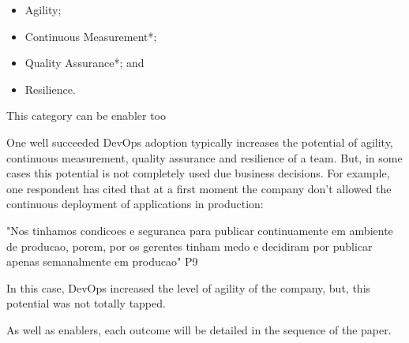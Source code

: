 \begin{itemize}
\item Agility;
\item Continuous Measurement*;
\item Quality Assurance*; and
\item Resilience.
\end{itemize}

\footnotesize * This category can be enabler too


\normalsize
One well succeeded DevOps adoption typically increases the potential of agility, continuous measurement, quality assurance and resilience of a team. But, in some cases this potential is not completely used due business decisions. For example, one respondent has cited that at a first moment the company don't allowed the continuous deployment of applications in production:

"Nos tinhamos condicoes e seguranca para publicar continuamente em ambiente de producao, porem, por os gerentes tinham medo e decidiram por publicar apenas semanalmente em producao" P9

In this case, DevOps increased the level of agility of the company, but, this potential was not totally tapped.

As well as enablers, each outcome will be detailed in the sequence of the paper.
